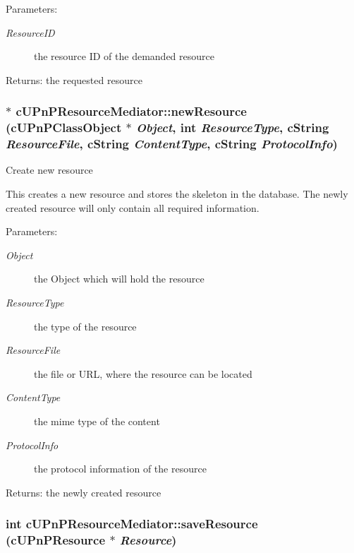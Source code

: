 \begin{Desc}
\item[Parameters:]
\begin{description}
\item[{\em ResourceID}]the resource ID of the demanded resource \end{description}
\end{Desc}
\begin{Desc}
\item[Returns:]the requested resource \end{Desc}
\hypertarget{classcUPnPResourceMediator_14367dd7e160f6c6812279b84a4fa8e2}{
\subsubsection[{newResource}]{ $\ast$ cUPnPResourceMediator::newResource ({\bf cUPnPClassObject} $\ast$ {\em Object}, \/  int {\em ResourceType}, \/  cString {\em ResourceFile}, \/  cString {\em ContentType}, \/  cString {\em ProtocolInfo})}}
\label{classcUPnPResourceMediator_14367dd7e160f6c6812279b84a4fa8e2}


Create new resource

This creates a new resource and stores the skeleton in the database. The newly created resource will only contain all required information.

\begin{Desc}
\item[Parameters:]
\begin{description}
\item[{\em Object}]the Object which will hold the resource \item[{\em ResourceType}]the type of the resource \item[{\em ResourceFile}]the file or URL, where the resource can be located \item[{\em ContentType}]the mime type of the content \item[{\em ProtocolInfo}]the protocol information of the resource \end{description}
\end{Desc}
\begin{Desc}
\item[Returns:]the newly created resource \end{Desc}
\hypertarget{classcUPnPResourceMediator_a633cef46d5cae9aecec05ea28d7c14e}{
\subsubsection[{saveResource}]{\setlength{\rightskip}{0pt plus 5cm}int cUPnPResourceMediator::saveResource ({\bf cUPnPResource} $\ast$ {\em Resource})}}
\label{classcUPnPResourceMediator_a633cef46d5cae9aecec05ea28d7c14e}


